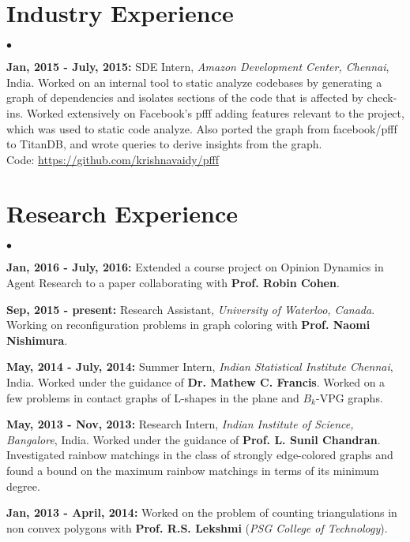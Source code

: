 \documentclass[margin,line]{res}
\newenvironment{list2}{
  \begin{list}{$\bullet$}{%
      \setlength{\itemsep}{0in}
      \setlength{\parsep}{0in} \setlength{\parskip}{0in}
      \setlength{\topsep}{0in} \setlength{\partopsep}{0in} 
      \setlength{\leftmargin}{0.2in}}}{\end{list}}
\begin{document}
\begin{resume}
\section{\sc Industry Experience}
\begin{list2}
\item \textbf{Jan, 2015 - July, 2015:} SDE Intern, \textit{Amazon Development Center, Chennai}, India.  Worked on
an internal tool to static analyze codebases by generating a graph of dependencies and isolates
sections of the code that is affected by check-ins.  Worked extensively on Facebook's pfff adding features relevant to the project, which was used to static code analyze.  Also ported the graph from facebook/pfff to TitanDB, and wrote queries to derive insights from the graph. \\Code: \url{https://github.com/krishnavaidy/pfff}
\end{list2}

\section{\sc Research Experience}
\begin{list2}
\item \textbf{Jan, 2016 - July, 2016:} Extended a course project on Opinion
  Dynamics in Agent Research to a paper collaborating with \textbf{Prof. Robin Cohen}.
  
\item \textbf{Sep, 2015 - present:} Research Assistant, \textit{University of
    Waterloo, Canada}. Working on reconfiguration problems in graph coloring with \textbf{Prof. Naomi Nishimura}.

\item \textbf{May, 2014 - July, 2014:} Summer Intern, \textit{Indian Statistical Institute Chennai}, India. Worked under the guidance of \textbf{Dr. Mathew C. Francis}. Worked on a few problems in contact graphs of L-shapes in the plane and $B_{k}$-VPG graphs.

\item \textbf{May, 2013 -  Nov, 2013:} Research Intern, \textit{Indian Institute of Science, Bangalore}, India. Worked under the guidance of \textbf{Prof. L. Sunil Chandran}. Investigated rainbow matchings in the class of strongly edge-colored graphs and found a bound on the maximum rainbow matchings in terms of its minimum degree.

\item \textbf{Jan, 2013 - April, 2014:} Worked on the problem of counting triangulations in non convex polygons with \textbf{Prof. R.S. Lekshmi} (\textit{PSG College of Technology}).


\end{list2}
\end{resume}
\end{document}
